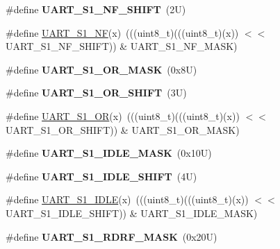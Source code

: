\begin{DoxyCompactItemize}
\#define {\bfseries U\+A\+R\+T\+\_\+\+S1\+\_\+\+N\+F\+\_\+\+S\+H\+I\+FT}~(2\+U)
\item 
\#define \mbox{\hyperlink{group___u_a_r_t___register___masks_ga760a28191818b8f67d146ea395e0fe5c}{U\+A\+R\+T\+\_\+\+S1\+\_\+\+NF}}(x)~(((uint8\+\_\+t)(((uint8\+\_\+t)(x)) $<$$<$ U\+A\+R\+T\+\_\+\+S1\+\_\+\+N\+F\+\_\+\+S\+H\+I\+FT)) \& U\+A\+R\+T\+\_\+\+S1\+\_\+\+N\+F\+\_\+\+M\+A\+SK)
\item 
\mbox{\label{group___u_a_r_t___register___masks_gac8102fb901477551dcc8505b3afb5272}} 
\#define {\bfseries U\+A\+R\+T\+\_\+\+S1\+\_\+\+O\+R\+\_\+\+M\+A\+SK}~(0x8\+U)
\item 
\mbox{\label{group___u_a_r_t___register___masks_ga34422d4914b457201229c9e14c74ced6}} 
\#define {\bfseries U\+A\+R\+T\+\_\+\+S1\+\_\+\+O\+R\+\_\+\+S\+H\+I\+FT}~(3\+U)
\item 
\#define \mbox{\hyperlink{group___u_a_r_t___register___masks_ga6a14f8ba40e6532f7ec986123702c119}{U\+A\+R\+T\+\_\+\+S1\+\_\+\+OR}}(x)~(((uint8\+\_\+t)(((uint8\+\_\+t)(x)) $<$$<$ U\+A\+R\+T\+\_\+\+S1\+\_\+\+O\+R\+\_\+\+S\+H\+I\+FT)) \& U\+A\+R\+T\+\_\+\+S1\+\_\+\+O\+R\+\_\+\+M\+A\+SK)
\item 
\mbox{\label{group___u_a_r_t___register___masks_gac1b555f14295616d01152013fe7704b9}} 
\#define {\bfseries U\+A\+R\+T\+\_\+\+S1\+\_\+\+I\+D\+L\+E\+\_\+\+M\+A\+SK}~(0x10\+U)
\item 
\mbox{\label{group___u_a_r_t___register___masks_gaf3efb8b468c18b3060dfc91b94256f82}} 
\#define {\bfseries U\+A\+R\+T\+\_\+\+S1\+\_\+\+I\+D\+L\+E\+\_\+\+S\+H\+I\+FT}~(4\+U)
\item 
\#define \mbox{\hyperlink{group___u_a_r_t___register___masks_ga59de164dc42e25b8ecf4625ad1271025}{U\+A\+R\+T\+\_\+\+S1\+\_\+\+I\+D\+LE}}(x)~(((uint8\+\_\+t)(((uint8\+\_\+t)(x)) $<$$<$ U\+A\+R\+T\+\_\+\+S1\+\_\+\+I\+D\+L\+E\+\_\+\+S\+H\+I\+FT)) \& U\+A\+R\+T\+\_\+\+S1\+\_\+\+I\+D\+L\+E\+\_\+\+M\+A\+SK)
\item 
\mbox{\label{group___u_a_r_t___register___masks_gab62f7e1b8548b5bbe5686f31c4beae61}} 
\#define {\bfseries U\+A\+R\+T\+\_\+\+S1\+\_\+\+R\+D\+R\+F\+\_\+\+M\+A\+SK}~(0x20\+U)
\item 
$$
\end{DoxyCompactItemize}
